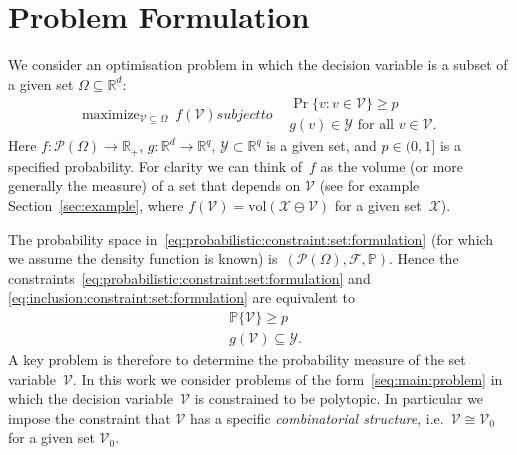 \documentclass[letterpaper, 10pt, conference]{ieeeconf} %
\DeclareMathOperator*{\maximize}{maximize}
\begin{document}
%
\section{Problem Formulation}\label{sec:problem:formulation}
%
%
%
We consider an optimisation problem in which the decision variable is a subset of a given set $\Omega \subseteq \mathbb R^d$: 
%
\begin{subequations}\label{seq:main:problem}
\begin{equation}
\maximize_{\mathcal V\subseteq \Omega} \ f(\mathcal V)
\end{equation}
subject to
\begin{align}
\label{eq:probabilistic:constraint:set:formulation}
        & \Pr \{ v : v\in\mathcal V \} \geq p \\
\label{eq:inclusion:constraint:set:formulation}
        & g(v)\in\mathcal Y \text{ for all } v \in \mathcal V.
\end{align}
\end{subequations}
%
Here $f: \mathscr P (\Omega) \to \mathbb R_+$, $g:\mathbb R^d\rightarrow \mathbb R^q$, $\mathcal Y\subset\mathbb R^q$ is a given set, and $p\in (0,1]$ is a specified probability.
%
For clarity we can think of~$f$ as the volume (or more generally the measure) of a set that depends on $\mathcal V$ (see for example Section~\ref{sec:example}, where $f(\mathcal V) = \text{vol}(\mathcal X\ominus\mathcal V)$ for a
given set~$\mathcal X$).
%

The probability space in~\eqref{eq:probabilistic:constraint:set:formulation} (for which we assume the density function is known) is~$(\mathscr P(\Omega), \mathscr F,\mathbb P)$. Hence the constraints~\eqref{eq:probabilistic:constraint:set:formulation} and \eqref{eq:inclusion:constraint:set:formulation}
 are equivalent to
%
\begin{subequations}
\begin{align}
	& \mathbb P\{\mathcal V\}\geq p \\
        & g(\mathcal V) \subseteq \mathcal Y .
\end{align}
%
\end{subequations}
%
A key problem is therefore to determine the probability measure of the set variable~$\mathcal V$.
%
In this work we consider problems of the form~\eqref{seq:main:problem} in which the decision variable~$\mathcal V$ is constrained to be polytopic. In particular we impose the constraint that $\mathcal V$ has a specific \emph{combinatorial structure}, i.e.~$\mathcal V\cong\mathcal V_0$ for a given set $\mathcal V_0$.
%
\end{document}
